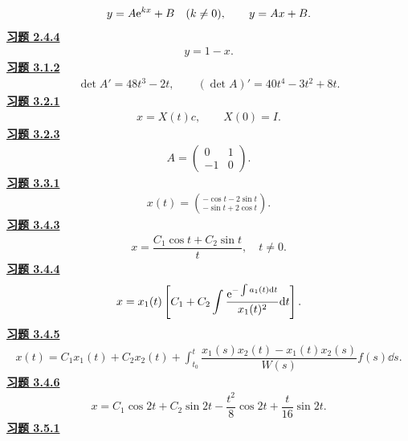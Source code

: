 \[\begin{gathered}y=A\mathrm e^{kx}+B\quad(k\ne0),\qquad y=Ax+B.\end{gathered}\]
\noindent\textbf{\hyperref[q:2.4.4]{习题 2.4.4}}
\[\begin{gathered}y=1-x.\end{gathered}\]
\noindent\textbf{\hyperref[q:3.1.2]{习题 3.1.2}}
\[\begin{gathered}\det A'=48t^3-2t,\qquad (\det A)'=40t^4-3t^2+8t.\end{gathered}\]
\noindent\textbf{\hyperref[q:3.2.1]{习题 3.2.1}}
\[\begin{gathered}x=X(t)c,\qquad X(0)=I.\end{gathered}\]
\noindent\textbf{\hyperref[q:3.2.3]{习题 3.2.3}}
\[\begin{gathered}A=\begin{pmatrix}0&1\\-1&0\end{pmatrix}.\end{gathered}\]
\noindent\textbf{\hyperref[q:3.3.1]{习题 3.3.1}}
\[\begin{gathered}x(t)=\binom{-\cos t-2\sin t}{-\sin t+2\cos t}.\end{gathered}\]
\noindent\textbf{\hyperref[q:3.4.3]{习题 3.4.3}}
\[\begin{gathered}x=\dfrac{C_1\cos t+C_2\sin t}{t},\quad t\ne0.\end{gathered}\]
\noindent\textbf{\hyperref[q:3.4.4]{习题 3.4.4}}
\[\begin{gathered}x=x_1(t)\left[C_1+C_2\int\dfrac{\mathrm e^{-\int a_1(t)\mathrm d t}}{x_1(t)^2}\mathrm d t\right].\end{gathered}\]
\noindent\textbf{\hyperref[q:3.4.5]{习题 3.4.5}}
\[\begin{gathered}x(t)=C_1x_1(t)+C_2x_2(t)+
\int_{t_0}^t\dfrac{x_1(s)x_2(t)-x_1(t)x_2(s)}{W(s)}f(s)\dd s.\end{gathered}\]
\noindent\textbf{\hyperref[q:3.4.6]{习题 3.4.6}}
\[\begin{gathered}x=C_1\cos2t+C_2\sin2t-\dfrac{t^2}{8}\cos2t+\dfrac t{16}\sin2t.\end{gathered}\]
\noindent\textbf{\hyperref[q:3.5.1]{习题 3.5.1}}
